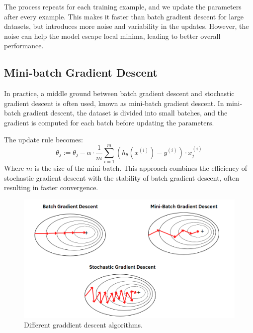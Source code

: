 \documentclass{book}
\begin{document}
The process repeats for each training example, and we update the parameters after every example. This makes it faster than batch gradient descent for large datasets, but introduces more noise and variability in the updates. However, the noise can help the model escape local minima, leading to better overall performance.

\subsection{Mini-batch Gradient Descent}
In practice, a middle ground between batch gradient descent and stochastic gradient descent is often used, known as mini-batch gradient descent. In mini-batch gradient descent, the dataset is divided into small batches, and the gradient is computed for each batch before updating the parameters.

The update rule becomes:
\[
\theta_j := \theta_j - \alpha \cdot \frac{1}{m} \sum_{i=1}^m (h_\theta(x^{(i)}) - y^{(i)}) \cdot x_j^{(i)}
\]
Where $m$ is the size of the mini-batch. This approach combines the efficiency of stochastic gradient descent with the stability of batch gradient descent, often resulting in faster convergence.

\begin{figure}[ht]
    \centering
    \includegraphics[width=\linewidth]{../assets/grad-descent-algorithms.png}
    \caption{Different graddient descent algorithms.}
\end{figure}
\end{document}
